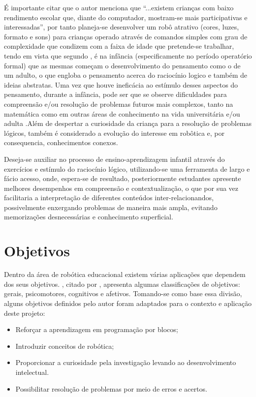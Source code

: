 É importante citar que o autor  menciona que “...existem crianças com baixo rendimento escolar
que, diante do computador, mostram-se mais participativas e interessadas”, por tanto planeja-se desenvolver um robô
atrativo (cores, luzes, formato e sons) para crianças operado através de comandos simples com grau de complexidade
que condizem com a faixa de idade que pretende-se trabalhar, tendo em vista que segundo ,
é na infância (especificamente no período operatório formal) que as mesmas começam o desenvolvimento do pensamento
como o de um adulto, o que engloba o pensamento acerca do raciocínio logico e também de ideias abstratas. Uma vez
que houve ineficácia ao estímulo desses aspectos do pensamento, durante a infância, pode ser que se observe
dificuldades para compreensão e/ou resolução de problemas futuros mais complexos, tanto na matemática como em
outras áreas de conhecimento na vida universitária e/ou adulta \cite{rauber:2003}.Além de despertar a curiosidade
da criança para a resolução de problemas lógicos, também é considerado a evolução do interesse em robôtica e, por
consequencia, conhecimentos conexos.

Deseja-se auxiliar no processo de ensino-aprendizagem infantil através do exercícios e estímulo do raciocínio lógico,
utilizando-se uma ferramenta de largo e fácio acesso, onde, espera-se de resultado, posteriormente estudantes 
apresente melhores desempenhos em compreensão e contextualização, o que por sua vez facilitaria a interpretação 
de diferentes conteúdos inter-relacionandos, possivelmente enxergando problemas de maneira mais ampla, evitando 
memorizações desnecessárias e conhecimento superficial.

\section{Objetivos}
Dentro da área de robótica educacional existem várias aplicações que dependem dos seus objetivos. ,
citado por , apresenta algumas classificações de objetivos: gerais, psicomotores, cognitivos e
afetivos. Tomando-se como base essa divisão, alguns objetivos definidos pelo autor foram adaptados para o contexto e
aplicação deste projeto:
\begin{itemize}
	\item Reforçar a aprendizagem em programação por blocos;
	\item Introduzir conceitos de robótica;
	\item Proporcionar a curiosidade pela investigação levando ao desenvolvimento intelectual.
	\item Possibilitar resolução de problemas por meio de erros e acertos.
\end{itemize}


